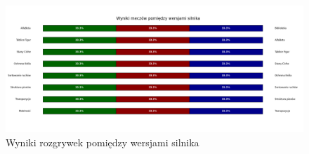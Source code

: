 \begin{figure}[ht]
    \centering
    \includegraphics[width=1\linewidth]{rozdzialy/rozdzial03/1_porownanie-wersji-silnika/rysunki/gry-wyniki}
    \caption{Wyniki rozgrywek pomiędzy wersjami silnika}
    \label{fig:wyniki-wersje}
\end{figure}